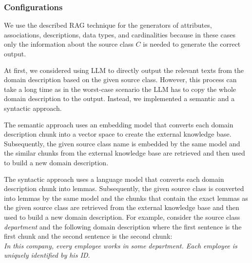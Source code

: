 \subsubsection{Configurations}
\label{sec:rag_configurations}

We use the described RAG technique for the generators of attributes, associations, descriptions, data types, and cardinalities because in these cases only the information about the source class $C$ is needed to generate the correct output.

At first, we considered using LLM to directly output the relevant texts from the domain description based on the given source class. However, this process can take a long time as in the worst-case scenario the LLM has to copy the whole domain description to the output. Instead, we implemented a semantic and a syntactic approach.


The semantic approach uses an embedding model that converts each domain description chunk into a vector space to create the external knowledge base. Subsequently, the given source class name is embedded by the same model and the similar chunks from the external knowledge base are retrieved and then used to build a new domain description.

The syntactic approach uses a language model that converts each domain description chunk into lemmas. Subsequently, the given source class is converted into lemmas by the same model and the chunks that contain the exact lemmas as the given source class are retrieved from the external knowledge base and then used to build a new domain description. For example, consider the source class \textit{department} and the following domain description where the first sentence is the first chunk and the second sentence is the second chunk: \\

\noindent{}\textit{In this company, every employee works in some department. Each employee is uniquely identified by his ID.} \\

